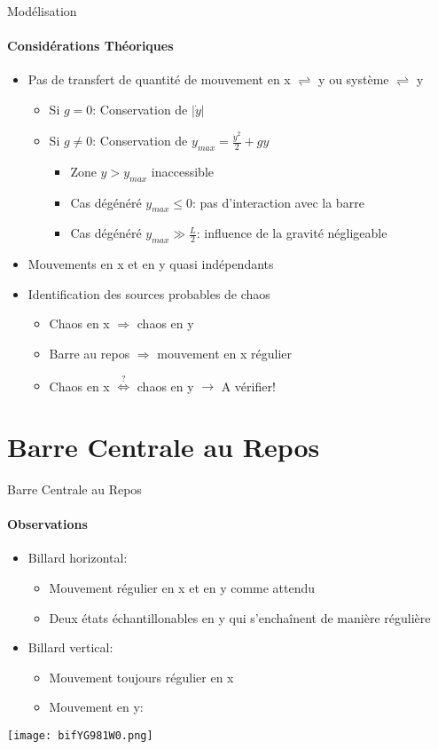 \documentclass{beamer}
\begin{document}
  \begin{frame}{Modélisation}
  \framesubtitle{Considérations Théoriques}
  \begin{itemize}
    \item Pas de transfert de quantité de mouvement en x \(\rightleftharpoons\) y ou système \(\rightleftharpoons\) y
     \begin{itemize}
       \item Si \(g=0\): Conservation de \(\lvert \dot{y} \rvert\)
       \item Si \(g\neq0\): Conservation de \(y_{max}=\frac{\dot{y}^2}{2}+gy\)
       \begin{itemize}
         \item Zone \(y>y_{max}\) inaccessible
         \pause \item Cas dégénéré \(y_{max} \leq 0\): pas d'interaction avec la barre
         \item Cas dégénéré \(y_{max} \gg \frac{L}{2}\): influence de la gravité négligeable
       \end{itemize}
     \end{itemize}
    \pause \item Mouvements en x et en y quasi indépendants
    \item Identification des sources probables de chaos
    \begin{itemize}
      \pause \item Chaos en x \(\Rightarrow\) chaos en y
      \item Barre au repos \(\Rightarrow\) mouvement en x régulier
      \pause \item Chaos en x \(\overset{?}{\Leftrightarrow}\) chaos en y \(\rightarrow\) A vérifier!
    \end{itemize}
  \end{itemize}
  \end{frame}
  
  \section{Barre Centrale au Repos}
  
  \begin{frame}{Barre Centrale au Repos}
  \framesubtitle{Observations}
  \begin{itemize}
    \item Billard horizontal:
    \begin{itemize}
      \item Mouvement régulier en x et en y comme attendu
      \item Deux états échantillonables en y qui s'enchaînent de manière régulière
    \end{itemize}
    \pause \item Billard vertical:
    \begin{itemize}
      \item Mouvement toujours régulier en x
      \pause \item Mouvement en y:
    \end{itemize}
  \end{itemize}
  \texttt{[image: bifYG981W0.png]}
  \end{frame}
  
\end{document}
